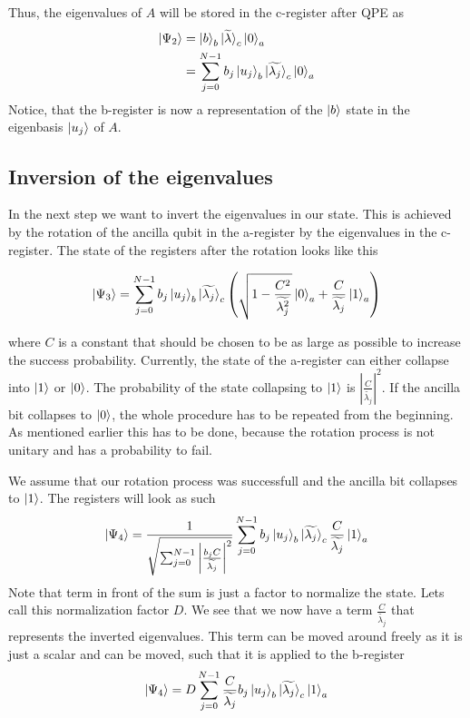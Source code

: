 Thus, the eigenvalues of $A$ will be stored in the c-register after QPE as
\begin{equation}
\begin{split}
\ket{\Psi_2} &= \ket{b}_b \ket{\widetilde{\lambda}}_c\ket{0}_a \\
& =\sum_{j=0}^{N-1} b_j \ket{u_j}_b \ket{\widetilde{\lambda_j}}_c \ket 0_a
\end{split}
\end{equation}
Notice, that the b-register is now a representation of the $\ket b$ state in the eigenbasis $\ket{u_j}$ of $A$.

\subsection{Inversion of the eigenvalues}
In the next step we want to invert the eigenvalues in our state. 
This is achieved by the rotation of the ancilla qubit in the a-register by the eigenvalues in the c-register.
The state of the registers after the rotation looks like this

\begin{equation}
\ket{\Psi_3} = \sum_{j=0}^{N-1} b_j \ket{u_j}_b {\ket{\widetilde{\lambda_j}}}_c \left(\sqrt{1-\frac{C^2}{\widetilde{\lambda_j^2}}}\ket{0}_a + \frac{C}{\widetilde{\lambda_j}} \ket{1}_a\right)
\end{equation}

where $C$ is a constant that should be chosen to be as large as possible to increase the success probability.
Currently, the state of the a-register can either collapse into $\ket 1$ or $\ket 0$. 
The probability of the state collapsing to $\ket 1$ is $\left|\frac C {\widetilde{\lambda_j}}\right|^2$.
If the ancilla bit collapses to $\ket 0$, the whole procedure has to be repeated from the beginning. 
As mentioned earlier this has to be done, because the rotation process is not unitary and has a probability to fail.

We assume that our rotation process was successfull and the ancilla bit collapses to $\ket 1$. 
The registers will look as such
\begin{equation}
\ket{\Psi_4}= \frac {1} {\sqrt{\sum_{j=0}^{N-1}   \left|  \frac{b_jC} {\widetilde{\lambda_j}}\right|^2   }} 
\sum_{j=0}^{N-1} b_j \ket{u_j}_b \ket{\widetilde{\lambda_j}}_c \frac{C}{\widetilde{\lambda_j}} \ket1_a
\end{equation}
Note that term in front of the sum is just a factor to normalize the state. 
Lets call this normalization factor $D$.
We see that we now have a term $\frac{C}{\widetilde{\lambda_j}}$ that represents the inverted eigenvalues. 
This term can be moved around freely as it is just a scalar and can be moved, such that it is applied to the b-register
\begin{equation}
\ket{\Psi_4}= D
\sum_{j=0}^{N-1} \frac{C}{\widetilde{\lambda_j}} b_j \ket{u_j}_b \ket{\widetilde{\lambda_j}}_c \ket1_a
\end{equation}

